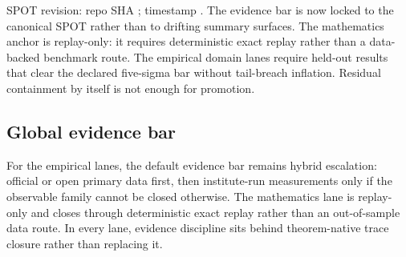 SPOT revision: repo SHA ; timestamp .
The evidence bar is now locked to the canonical SPOT rather than to drifting summary surfaces. The mathematics anchor is replay-only: it requires deterministic exact replay rather than a data-backed benchmark route. The empirical domain lanes require held-out results that clear the declared five-sigma bar without tail-breach inflation. Residual containment by itself is not enough for promotion.

\subsection{Global evidence bar}
For the empirical lanes, the default evidence bar remains hybrid escalation: official or open primary data first, then institute-run measurements only if the observable family cannot be closed otherwise. The mathematics lane is replay-only and closes through deterministic exact replay rather than an out-of-sample data route. In every lane, evidence discipline sits behind theorem-native trace closure rather than replacing it.

